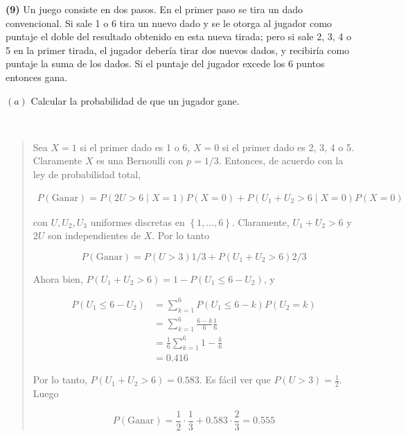 \documentclass[a4paper, 12pt]{article}
\begin{document}
\pagebreak 

\textbf{(9)} Un juego consiste en dos pasos. En el primer paso se tira un dado
convencional. Si sale 1 o 6 tira un nuevo dado y se le otorga al jugador como
puntaje el doble del resultado obtenido en esta nueva tirada; pero si sale 2, 3,
4 o 5 en la primer tirada, el jugador debería tirar dos nuevos dados, y
recibiría como puntaje la suma de los dados. Si el puntaje del jugador excede
los 6 puntos entonces gana.

$(a)$ Calcular la probabilidad de que un jugador gane.  

~ 


\small
\begin{quote}

Sea $X = 1$ si el primer dado es 1 o 6, $X = 0$ si el primer dado es 2, 3, 4 o
5. Claramente $X$ es una Bernoulli con $p = 1 / 3$. Entonces, de acuerdo con la
ley de probabilidad total,

\begin{align*}
  P(\text{Ganar}) = P(2U > 6 \mid X = 1 )P(X = 0) + P(U_1 + U_2 > 6 \mid X = 0
  )P(X = 0 )
\end{align*}

con $U, U_2, U_3$ uniformes discretas en $\left\{ 1,\ldots,6 \right\} $.
Claramente, $U_1 + U_2 > 6$ y $2U$ son independientes de $X$. Por lo tanto 

\begin{equation*}
  P(\text{Ganar}) = P(U > 3) 1 / 3 + P(U_1 + U_2 > 6) 2 / 3
\end{equation*}

Ahora bien, $P(U_1 + U_2 > 6) = 1 - P(U_1 \leq 6 - U_2)$, y

\begin{align*}
  P(U_1 \leq 6 - U_2) 
  &= \sum_{k=1}^6 P(U_1 \leq 6 - k)P(U_2 = k) \\ 
  &=\sum_{k=1}^6 \frac{6-k}{6}\frac{1}{6} \\ 
  &=\frac{1}{6}\sum_{k=1}^6 1 - \frac{k}{6} \\ 
  &=0.416
\end{align*}

Por lo tanto, $P(U_1 + U_2 > 6) = 0.583$. Es fácil ver que $P(U > 3) =
\frac{1}{2}$. Luego 

\begin{equation*}
  P(\text{Ganar}) = \frac{1}{2} \cdot \frac{1}{3} + 0.583 \cdot \frac{2}{3} =
  0.555
\end{equation*}

\end{quote}
\normalsize
\end{document}
